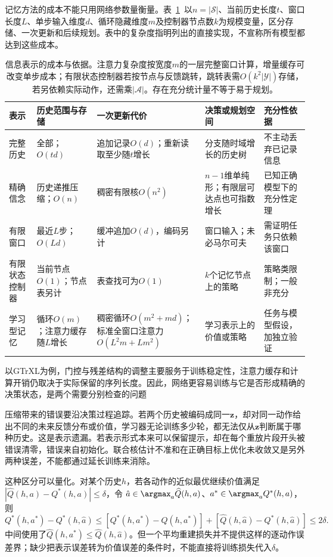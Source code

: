 记忆方法的成本不能只用网络参数量衡量。表~\ref{tab:rl-information-memory-cost}~以$n=|\mathcal S|$、当前历史长度$t$、窗口长度$L$、单步输入维度$d$、循环隐藏维度$m$及控制器节点数$k$为规模变量，区分存储、一次更新和后续规划。表中的复杂度指明列出的直接实现，不宣称所有模型都达到这些成本。

\begin{table}[htbp]
  \centering
  \small
  \begin{tabularx}{\linewidth}{p{21mm}XXXX}
    \toprule
    表示 & 历史范围与存储 & 一次更新代价 & 决策或规划空间 & 充分性依据 \\
    \midrule
    完整历史 & 全部；$O(td)$ & 追加记录$O(d)$；重新读取至少随$t$增长 & 分支随时域增长的历史树 & 不主动丢弃已记录信息 \\
    精确信念 & 历史递推压缩；$O(n)$ & 稠密有限核$O(n^2)$ & $n-1$维单纯形；有限层可达点也可指数增长 & 已知正确模型下的充分性定理 \\
    有限窗口 & 最近$L$步；$O(Ld)$ & 缓冲追加$O(d)$，编码另计 & 窗口输入；未必马尔可夫 & 需证明任务只依赖该窗口 \\
    有限状态控制器 & 当前节点$O(1)$；节点表另计 & 表查找可为$O(1)$ & $k$个记忆节点上的策略 & 策略类限制；一般非充分 \\
    学习型记忆 & 循环$O(m)$；注意力缓存随$L$增长 & 稠密循环$O(m^2+md)$；标准全窗口注意力$O(L^2m+Lm^2)$ & 学习表示上的价值或策略 & 任务与模型假设，加独立验证 \\
    \bottomrule
  \end{tabularx}
  \caption{信息表示的成本与依据。注意力复杂度按宽度$m$的一层完整窗口计算，增量缓存可改变单步成本；有限状态控制器若按节点与反馈跳转，跳转表需$O(k^2|\mathcal Y|)$存储，若另依赖实际动作，还需乘$|\mathcal A|$。存在充分统计量不等于易于规划。}
  \label{tab:rl-information-memory-cost}
\end{table}

以GTrXL为例，门控与残差结构的调整主要服务于训练稳定性，注意力缓存和计算开销仍取决于实际保留的序列长度。因此，网络更容易训练与它是否形成精确的决策状态，是两个需要分别检查的问题

压缩带来的错误要沿决策过程追踪。若两个历史被编码成同一$\bm z$，却对同一动作给出不同的未来反馈分布或价值，学习器无论训练多少轮，都无法仅从$\bm z$判断属于哪种历史。这是表示遗漏。若表示形式本来可以保留提示，却在每个重放片段开头被错误清零，错误来自初始化。联合核估计不准和在正确目标上优化未收敛又是另外两种误差，不能都通过延长训练来消除。

这种区分可以量化。对某个历史$h$，若各动作的近似最优继续价值满足
$|\widehat Q(h,a)-Q^*(h,a)|\leq\delta$，令
$\hat a\in\argmax_a\widehat Q(h,a)$、$a^*\in\argmax_aQ^*(h,a)$，则
\[
  Q^*(h,a^*)-Q^*(h,\hat a)
  \leq
  [Q^*(h,a^*)-\widehat Q(h,a^*)]
  +[\widehat Q(h,\hat a)-Q^*(h,\hat a)]
  \leq2\delta.
\]
中间使用了$\widehat Q(h,a^*)\leq\widehat Q(h,\hat a)$。但一个平均重建损失并不提供这样的逐动作误差界；缺少把表示误差转为价值误差的条件时，不能直接将训练损失代入$\delta$。

